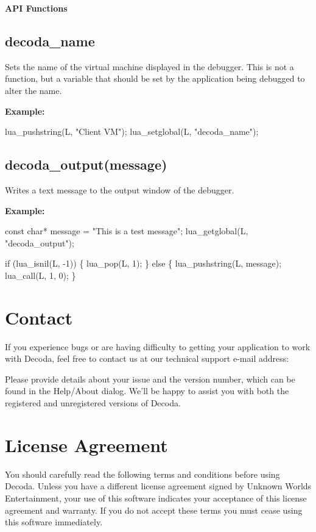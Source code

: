 \textbf{API Functions}

\section{decoda_name}\label{decoda_name}

Sets the name of the virtual machine displayed in the debugger. This is not a function, but
a variable that should be set by the application being debugged to alter the name.

\textbf{Example:}

{\verbatim lua_pushstring(L, "Client VM");
lua_setglobal(L, "decoda_name"); }

\section{decoda_output(message)}\label{decoda_output}

Writes a text message to the output window of the debugger.

\textbf{Example:}

{\verbatim const char* message = "This is a test message";
lua_getglobal(L, "decoda_output");

if (lua_isnil(L, -1))
\{
    lua_pop(L, 1);
\}
else
\{
    lua_pushstring(L, message);
    lua_call(L, 1, 0);
\}
}

\chapter{Contact}\label{contact}

If you experience bugs or are having difficulty to getting your application
to work with Decoda, feel free to contact us at our technical support e-mail
address:


Please provide details about your issue and the version number, which can be
found in the Help/About dialog. We'll be happy to assist you with both the
registered and unregistered versions of Decoda.

\chapter{License Agreement}\label{license}

You should carefully read the following terms and conditions before using Decoda.
Unless you have a different license agreement signed by Unknown Worlds Entertainment,
your use of this software indicates your acceptance of this license agreement and
warranty. If you do not accept these terms you must cease using this software immediately.

